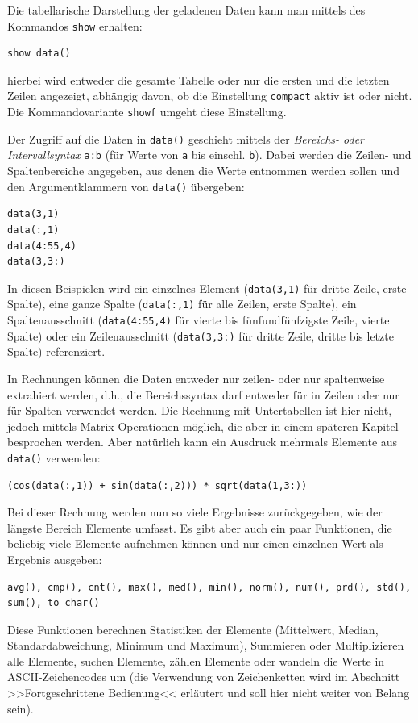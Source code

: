 \documentclass[DIV=14,headsepline,footsepline]{scrbook}
\begin{document}
				Die tabellarische Darstellung der geladenen Daten kann man mittels des Kommandos \verb+show+ erhalten:
				\begin{lstlisting}
show data()
				\end{lstlisting}
				hierbei wird entweder die gesamte Tabelle oder nur die ersten und die letzten Zeilen angezeigt, abhängig davon, ob die Einstellung \verb+compact+ aktiv ist oder nicht. Die Kommandovariante \verb+showf+ umgeht diese Einstellung.
				
				Der Zugriff auf die Daten in \verb+data()+ geschieht mittels der \emph{Bereichs- oder Intervallsyntax} \verb+a:b+ (für Werte von \verb+a+ bis einschl. \verb+b+). Dabei werden die Zeilen- und Spaltenbereiche angegeben, aus denen die Werte entnommen werden sollen und den Argumentklammern von \verb+data()+ übergeben:
				\begin{lstlisting}
data(3,1)
data(:,1)
data(4:55,4)
data(3,3:)
				\end{lstlisting}
				In diesen Beispielen wird ein einzelnes Element (\verb+data(3,1)+ für dritte Zeile, erste Spalte), eine ganze Spalte (\verb+data(:,1)+ für alle Zeilen, erste Spalte), ein Spaltenausschnitt (\verb+data(4:55,4)+ für vierte bis fünfundfünfzigste Zeile, vierte Spalte) oder ein Zeilenausschnitt (\verb+data(3,3:)+ für dritte Zeile, dritte bis letzte Spalte) referenziert.
				
				In Rechnungen können die Daten entweder nur zeilen- oder nur spaltenweise extrahiert werden, d.h., die Bereichssyntax darf entweder für in Zeilen oder nur für Spalten verwendet werden. Die Rechnung mit Untertabellen ist hier nicht, jedoch mittels Matrix-Operationen möglich, die aber in einem späteren Kapitel besprochen werden. Aber natürlich kann ein Ausdruck mehrmals Elemente aus \verb+data()+ verwenden:
				\begin{lstlisting}
(cos(data(:,1)) + sin(data(:,2))) * sqrt(data(1,3:))
				\end{lstlisting}
				Bei dieser Rechnung werden nun so viele Ergebnisse zurückgegeben, wie der längste Bereich Elemente umfasst. Es gibt aber auch ein paar Funktionen, die beliebig viele Elemente aufnehmen können und nur einen einzelnen Wert als Ergebnis ausgeben:
				\begin{lstlisting}
avg(), cmp(), cnt(), max(), med(), min(), norm(), num(), prd(), std(), sum(), to_char()
				\end{lstlisting}
				Diese Funktionen berechnen Statistiken der Elemente (Mittelwert, Median, Standardabweichung, Minimum und Maximum), Summieren oder Multiplizieren alle Elemente, suchen Elemente, zählen Elemente oder wandeln die Werte in ASCII-Zeichencodes um (die Verwendung von Zeichenketten wird im Abschnitt >>Fortgeschrittene Bedienung<< erläutert und soll hier nicht weiter von Belang sein).
				
\end{document}
